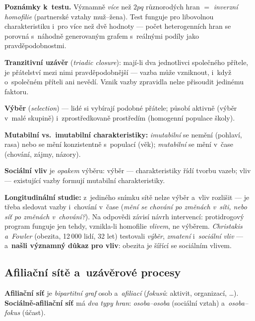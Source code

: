 \documentclass[11pt,a4paper]{article}
\theoremstyle{definition}
\begin{document}
\textbf{Poznámky k~testu.} Významně \emph{více} než $2pq$ různorodých hran $=$
\emph{inverzní homofilie} (partnerské vztahy muž--žena). Test funguje pro libovolnou
charakteristiku i~pro více než dvě hodnoty --- počet heterogenních hran se porovná s~náhodně
generovaným grafem s~reálnými podíly jako pravděpodobnostmi.

\begin{defbox}
\textbf{Tranzitivní uzávěr} (\emph{triadic closure}): mají-li dva jednotlivci společného
přítele, je přátelství mezi nimi pravděpodobnější --- vazba může vzniknout, i~když o~společném
příteli ani nevědí. Vznik vazby zpravidla nelze přisoudit jedinému faktoru.

\textbf{Výběr} (\emph{selection}) --- lidé si vybírají podobné přátele; působí aktivně
(výběr v~malé skupině) i~zprostředkovaně prostředím (homogenní populace školy).

\textbf{Mutabilní vs.\ imutabilní charakteristiky:} \emph{imutabilní} se nemění (pohlaví,
rasa) nebo se mění konzistentně s~populací (věk); \emph{mutabilní} se mění v~čase (chování,
zájmy, názory).

\textbf{Sociální vliv} je \emph{opakem} výběru: výběr --- charakteristiky řídí tvorbu vazeb;
vliv --- existující vazby formují mutabilní charakteristiky.
\end{defbox}

\textbf{Longitudinální studie:} z~jediného snímku sítě nelze výběr a~vliv rozlišit --- je
třeba sledovat vazby i~chování v~čase (\emph{mění se chování po změnách v~síti, nebo síť po
změnách v~chování?}). Na odpovědi závisí návrh intervencí: protidrogový program  funguje jen tehdy, vznikla-li homofilie \emph{vlivem}, ne výběrem.
\emph{Christakis a~Fowler} (obezita, 12\,000 lidí, 32 let) testovali \emph{výběr},
\emph{zmatení} i~\emph{sociální vliv} --- a~\textbf{našli významný důkaz pro vliv}: obezita
je  šířící se sociálním vlivem.

\subsection{Afiliační sítě a~uzávěrové procesy}

\begin{defbox}
\textbf{Afiliační síť} je \emph{bipartitní graf} osob a~\emph{afiliací} (\emph{fokusů}:
aktivit, organizací, \dots). \textbf{Sociálně-afiliační síť} má \emph{dva typy hran}:
\emph{osoba--osoba} (sociální vztah) a~\emph{osoba--fokus} (účast).
\end{defbox}
\end{document}
